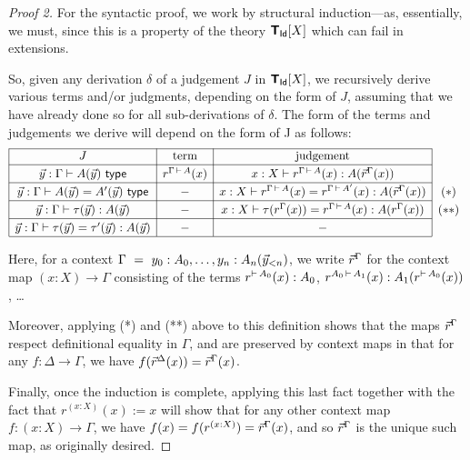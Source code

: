 \begin{proof}[Proof 2] For the syntactic proof, we work by structural induction---as, essentially, we must, since this is a property of the theory $\textbf{\textsf{T}}_{\mathsf{Id}}[X]$ which can fail in extensions.

So, given any derivation $\delta$ of a judgement $J$ in $\T_\Id[X]$, we recursively derive various terms and/or judgments, depending on the form of $J$, assuming that we have already done so for all sub-derivations of $\delta$.  The form of the terms and judgements we derive will depend on the form of J as follows:
$$\begin{array}{|c|c|c|c}
\cline{1-3} \rule[-1ex]{0ex}{3.1ex}
J & \textrm{term} & \textrm{judgement} & \\ 

\cline{1-3}  \rule[-1ex]{0ex}{3.5ex} 
\y:\Gamma \types A(\y)\ \type & r^{\Gamma \,\types\, A}(x) & x:X \types r^{\Gamma \,\types\, A}(x) : A(\r^\Gamma (x)) & \\ 

\cline{1-3}  \rule[-1ex]{0ex}{3.5ex} 
\y:\Gamma \types A(\y) = A'(\y) \ \type & - & x:X \types r^{\Gamma \,\types\, A}(x) = r^{\Gamma \,\types\, A'}(x) : A(\r^\Gamma (x)) & (*) \\

\cline{1-3}  \rule[-1ex]{0ex}{3.5ex} 
\y:\Gamma \types \tau(\y) : A(\y) & - & x:X \types \tau(r^\Gamma (x)) = r^{\Gamma \,\types\, A} (x) : A(r^\Gamma (x)) & (**) \\ 

\cline{1-3}  \rule[-1ex]{0ex}{3.5ex} 
\y:\Gamma \types \tau(\y) = \tau'(\y) : A(\y) & - & - & \\ 

\cline{1-3} \end{array}$$

Here, for a context $\Gamma\ =\ y_0:A_0, \ldots, y_n : A_n(\vec y_{< n})$, we write $\vec r^\Gamma$ for the context map $(x:X) \to \Gamma$ consisting of the terms $r^{\vdash\,A_0}(x) : A_0$, $r^{A_0\, \vdash\, A_1}(x) : A_1(r^{\vdash\,A_0}(x))$, \ldots %

Moreover, applying (*) and (**) above to this definition shows that the maps $\vec r^\Gamma$ respect definitional equality in $\Gamma$, and are preserved by context maps in that for any $f \colon \Delta \to \Gamma$, we have $f(\vec r^\Delta (x)) = \vec r^\Gamma (x)$.

Finally, once the induction is complete, applying this last fact together with the fact that $r^{(x:X)}(x) := x$ will show that for any other context map $f \colon (x:X) \to \Gamma$, we have $f(x) = f(r^{(x:X)}) = \vec r^\Gamma (x)$, and so $\vec r^\Gamma$ is the unique such map, as originally desired.


\end{proof}
